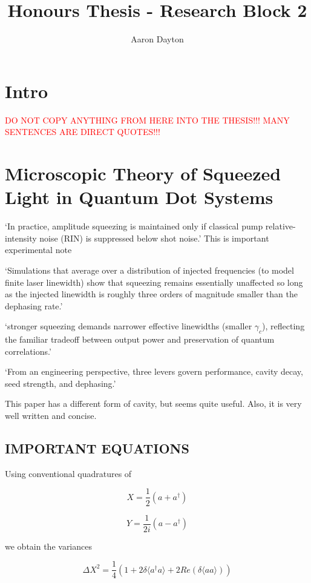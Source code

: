 \documentclass[aps,pra,twocolumn,showpacs,amsmath,amssymb,nofootinbib,longbibliography,superscriptaddress
]{revtex4-1}
\theoremstyle{definition}
\theoremstyle{remark}
\newcommand{\0}{\hat{0}}
\begin{document}
\title{Honours Thesis - Research Block 2}
\author{Aaron Dayton}

\maketitle

\section{Intro}

\textcolor{red}{DO NOT COPY ANYTHING FROM HERE INTO THE THESIS!!! MANY SENTENCES ARE DIRECT QUOTES!!!}

\section{Microscopic Theory of Squeezed Light in Quantum Dot Systems}

`In practice, amplitude squeezing is maintained only if classical pump relative-intensity noise (RIN) is suppressed below shot noise.' This is important experimental note

`Simulations that average over a distribution of injected frequencies (to model finite laser linewidth) show that squeezing remains essentially unaffected so long as the injected linewidth is roughly three orders of magnitude smaller than the dephasing rate.'

`stronger squeezing demands narrower effective linewidths (smaller $\gamma_c$), reflecting the familiar tradeoff between output power and preservation of quantum correlations.'

`From an engineering perspective, three levers govern performance, cavity decay, seed strength, and dephasing.'

This paper has a different form of cavity, but seems quite useful. Also, it is very well written and concise.

\subsection{IMPORTANT EQUATIONS}

Using conventional quadratures of 

$$
X = \frac{1}{2} (a + a^{\dagger})
$$

$$
Y = \frac{1}{2i} (a - a^{\dagger})
$$

we obtain the variances

$$
\Delta X^2 = \frac{1}{4} (1 + 2 \delta \langle a^{\dagger} a \rangle + 2Re(\delta \langle a a \rangle))
$$
\end{document}
